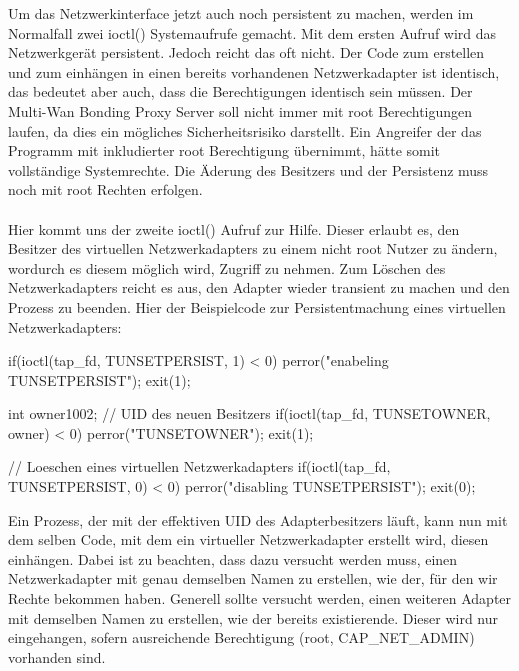 Um das Netzwerkinterface jetzt auch noch persistent zu machen, werden im Normalfall zwei ioctl() Systemaufrufe gemacht. Mit dem ersten Aufruf wird das Netzwerkgerät persistent. Jedoch reicht das oft nicht. Der Code zum erstellen und zum einhängen in einen bereits vorhandenen Netzwerkadapter ist identisch, das bedeutet aber auch, dass die Berechtigungen identisch sein müssen. Der Multi-Wan Bonding Proxy Server soll nicht immer mit root Berechtigungen laufen, da dies ein mögliches Sicherheitsrisiko darstellt. Ein Angreifer der das Programm mit inkludierter root Berechtigung übernimmt, hätte somit vollständige Systemrechte. Die Äderung des Besitzers und der Persistenz muss noch mit root Rechten erfolgen.
\\\\
Hier kommt uns der zweite ioctl() Aufruf zur Hilfe. Dieser erlaubt es, den Besitzer des virtuellen Netzwerkadapters zu einem nicht root Nutzer zu ändern, wordurch es diesem möglich wird, Zugriff zu nehmen. Zum Löschen des Netzwerkadapters reicht es aus, den Adapter wieder transient zu machen und den Prozess zu beenden. Hier der Beispielcode zur Persistentmachung eines virtuellen Netzwerkadapters:
\begin{program}[H]
    \begin{CppCode}
        if(ioctl(tap_fd, TUNSETPERSIST, 1) < 0){
            perror("enabeling TUNSETPERSIST");
            exit(1);
        }
        
        int owner{1002}; // UID des neuen Besitzers
        if(ioctl(tap_fd, TUNSETOWNER, owner) < 0){
            perror("TUNSETOWNER");
            exit(1);
        }

        // Loeschen eines virtuellen Netzwerkadapters
        if(ioctl(tap_fd, TUNSETPERSIST, 0) < 0){
            perror("disabling TUNSETPERSIST");
        }
        exit(0);
    \end{CppCode}
\end{program}
\noindent
Ein Prozess, der mit der effektiven UID des Adapterbesitzers läuft, kann nun mit dem selben Code, mit dem ein virtueller Netzwerkadapter erstellt wird, diesen einhängen. Dabei ist zu beachten, dass dazu versucht werden muss, einen Netzwerkadapter mit genau demselben Namen zu erstellen, wie der, für den wir Rechte bekommen haben. Generell sollte versucht werden, einen weiteren Adapter mit demselben Namen zu erstellen, wie der bereits existierende. Dieser wird nur eingehangen, sofern ausreichende Berechtigung (root, CAP\_NET\_ADMIN) vorhanden sind. 

